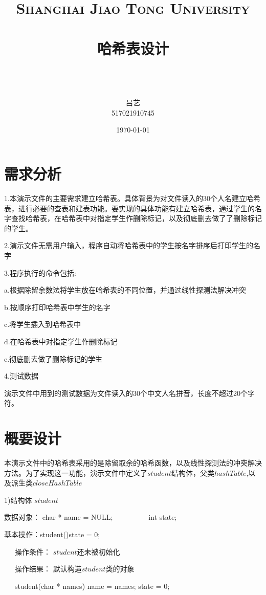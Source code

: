 \documentclass[paper=a4,UTF8,fontsize=11pt]{scrartcl} %
\title{
\normalfont \normalsize
\textsc{Shanghai Jiao Tong University} \\ [25pt] %
\horrule{0.5pt} \\[0.4cm] %
\huge \kaishu 哈希表设计 \\ %
\horrule{2pt} \\[0.5cm] %
}
\author{\\ \kaishu 吕艺\\ \normalsize 517021910745} %
\date{\normalsize\today} %
\numberwithin{equation}{section} %
\numberwithin{figure}{section} %
\numberwithin{table}{section} %
\begin{document}
\maketitle %
\kaishu
\section{需求分析}

1.本演示文件的主要需求建立哈希表。具体背景为对文件读入的30个人名建立哈希表，进行必要的查表和建表功能。要实现的具体功能有建立哈希表，通过学生的名字查找哈希表，在哈希表中对指定学生作删除标记，以及彻底删去做了了删除标记的学生。
\vspace{0.5cm}

2.演示文件无需用户输入，程序自动将哈希表中的学生按名字排序后打印学生的名字
\vspace{0.5cm}

3.程序执行的命令包括:

a.根据除留余数法将学生放在哈希表的不同位置，并通过线性探测法解决冲突

b.按顺序打印哈希表中学生的名字

c.将学生插入到哈希表中

d.在哈希表中对指定学生作删除标记

e.彻底删去做了删除标记的学生

\vspace{0.5cm}
4.测试数据

演示文件中用到的测试数据为文件读入的30个中文人名拼音，长度不超过20个字符。
\vspace{0.8cm}

\section{概要设计}

本演示文件中的哈希表采用的是除留取余的哈希函数，以及线性探测法的冲突解决方法。为了实现这一功能，演示文件中定义了$student$结构体，父类$hashTable$,以及派生类$closeHashTable$

1)结构体 $student$

数据对象： char * name = NULL;\ \ \ \ \ \ \ \ \ \ \quad int state;

基本操作：student(){state = 0;}

\qquad \qquad \quad \ \ \ 操作条件： $student$还未被初始化

\qquad \qquad \quad \ \ \ 操作结果： 默认构造$student$类的对象

\qquad \qquad \quad \ \ \     student(char * names) {name = names; state = 0;}
\end{document}
